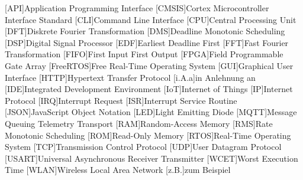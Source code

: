 \documentclass[../EDF Master Thesis.tex]{subfiles}
\begin{document}
    \begin{acronym}[abkuerzungen]
        [API]{Application Programming Interface}
        [CMSIS]{Cortex Microcontroller Interface Standard}
        [CLI]{Command Line Interface}
        [CPU]{Central Processing Unit}
        [DFT]{Diskrete Fourier Transformation}
        [DMS]{Deadline Monotonic Scheduling}
        [DSP]{Digital Signal Processor}
        [EDF]{Earliest Deadline First}
        [FFT]{Fast Fourier Transformation}
        [FIFO]{First Input First Output}
        [FPGA]{Field Programmable Gate Array}
        [FreeRTOS]{Free Real-Time Operating System}
        [GUI]{Graphical User Interface}
        [HTTP]{Hypertext Transfer Protocol}
        [i.A.a]{in Anlehnung an}
        [IDE]{Integrated Development Environment}
        [IoT]{Internet of Things}
        [IP]{Internet Protocol}
        [IRQ]{Interrupt Request}
        [ISR]{Interrupt Service Routine}
        [JSON]{JavaScript Object Notation}
        [LED]{Light Emitting Diode}
        [MQTT]{Message Queuing Telemetry Transport}
        [RAM]{Random-Access Memory}
        [RMS]{Rate Monotonic Scheduling}
        [ROM]{Read-Only Memory}
        [RTOS]{Real-Time Operating System}
        [TCP]{Transmission Control Protocol}
        [UDP]{User Datagram Protocol}
        [USART]{Universal Asynchronous Receiver Transmitter}
        [WCET]{Worst Execution Time}
        [WLAN]{Wireless Local Area Network}
        [z.B.]{zum Beispiel}
	\end{acronym}
\end{document}
